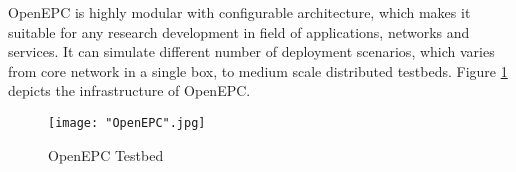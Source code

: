 \documentclass[english]{tktltiki2}
\theoremstyle{definition}
\theoremstyle{remark}
\begin{document}
OpenEPC is highly modular with configurable architecture, which makes it suitable for any research development in field of applications, networks and services. It can simulate different number of deployment scenarios, which varies from core network in a single box, to medium scale distributed testbeds. Figure \ref{fig:OpenEPC} depicts the infrastructure of OpenEPC.  

\begin{figure}[h!t]
\centering
{}
\texttt{[image: "OpenEPC".jpg]}
\caption{OpenEPC Testbed \cite{OpenEPC}}
\label{fig:OpenEPC}
\end{figure}

\clearpage



%
%
% 
%


% 





% 
\end{document}
